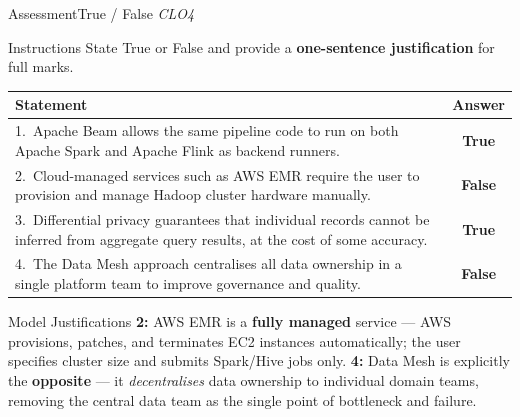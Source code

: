 \documentclass[aspectratio=169,10pt]{beamer}
\begin{document}
\begin{frame}{Assessment\textemdash True / False \hfill\small\textit{CLO4}}
  \begin{block}{Instructions}
    State True or False and provide a \textbf{one-sentence justification} for full marks.
  \end{block}
  \vspace{4pt}
  \centering
  \renewcommand{\arraystretch}{1.6}
  \begin{tabular}{p{9.0cm}c}
    \toprule
    \textbf{Statement} & \textbf{Answer} \\
    \midrule
    1.\ Apache Beam allows the same pipeline code to run on both Apache Spark and Apache Flink as backend runners. &
    \textbf{True} \\
    2.\ Cloud-managed services such as AWS EMR require the user to provision and manage Hadoop cluster hardware manually. &
    \alert{\textbf{False}} \\
    3.\ Differential privacy guarantees that individual records cannot be inferred from aggregate query results, at the cost of some accuracy. &
    \textbf{True} \\
    4.\ The Data Mesh approach centralises all data ownership in a single platform team to improve governance and quality. &
    \alert{\textbf{False}} \\
    \bottomrule
  \end{tabular}
  \vspace{6pt}
  \begin{exampleblock}{Model Justifications}
    \small \textbf{2:} AWS EMR is a \textbf{fully managed} service --- AWS provisions, patches, and terminates EC2 instances automatically; the user specifies cluster size and submits Spark/Hive jobs only.  \textbf{4:} Data Mesh is explicitly the \textbf{opposite} --- it \textit{decentralises} data ownership to individual domain teams, removing the central data team as the single point of bottleneck and failure.
  \end{exampleblock}
\end{frame}
\end{document}
